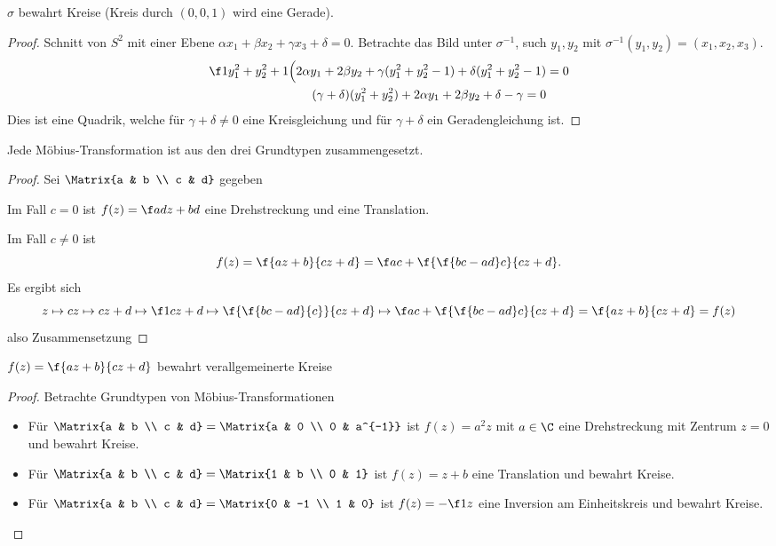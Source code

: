 \begin{lem}
	$\sigma$ bewahrt Kreise (Kreis durch $(0,0,1)$ wird eine Gerade).
	\begin{proof}
		Schnitt von $S^2$ mit einer Ebene $\alpha x_1 + \beta x_2 + \gamma x_3 + \delta = 0$.
		Betrachte das Bild unter $\sigma^{-1}$, such $y_1, y_2$ mit $\sigma^{-1}(y_1, y_2) = (x_1, x_2, x_3)$.
		\begin{align*}
			\f 1{y_1^2 + y_2^2 + 1} \Big( 2 \alpha y_1 + 2 \beta y_2 + \gamma (y_1^2 + y_2^2 - 1) + \delta (y_1^2 + y_2^2 - 1) &= 0 \\
			(\gamma + \delta)(y_1^2 + y_2^2) + 2 \alpha y_1 + 2 \beta y_2 + \delta - \gamma = 0
		\end{align*}
		Dies ist eine Quadrik, welche für $\gamma + \delta \neq 0$ eine Kreisgleichung und für $\gamma + \delta$ ein Geradengleichung ist.
	\end{proof}
\end{lem}

\begin{lem}
	Jede Möbius-Transformation ist aus den drei Grundtypen zusammengesetzt.
	\begin{proof}
		Sei $\Matrix{a & b \\ c & d}$ gegeben

		Im Fall $c = 0$ ist $f(z) = \f a d z + bd$ eine Drehstreckung und eine Translation.

		Im Fall $c \neq 0$ ist
		\[
			f(z) = \f {az + b}{cz + d}
			= \f ac + \f {\f {bc - ad}c}{cz + d}.
		\]
		Es ergibt sich
		\[
			z \mapsto c z \mapsto c z + d \mapsto \f 1{cz + d} \mapsto \f{\f{bc - ad}{c}}{cz + d} \mapsto \f ac + \f{\f{bc-ad}c}{cz+d} = \f {az + b}{cz + d} = f(z)
		\]
		also Zusammensetzung
	\end{proof}
\end{lem}

\begin{lem}
	$f(z) = \f {az + b} {cz + d}$ bewahrt verallgemeinerte Kreise
	\begin{proof}
		Betrachte Grundtypen von Möbius-Transformationen
		\begin{itemize}
			\item
				Für $\Matrix{a & b \\ c & d} = \Matrix{a & 0 \\ 0 & a^{-1}}$ ist $f(z) = a^2 z$ mit $a \in \C$ eine Drehstreckung mit Zentrum $z=0$ und bewahrt Kreise.
			\item
				Für $\Matrix{a & b \\ c & d} = \Matrix{1 & b \\ 0 & 1}$ ist $f(z) = z + b$ eine Translation und bewahrt Kreise.
			\item
				Für $\Matrix{a & b \\ c & d} = \Matrix{0 & -1 \\ 1 & 0}$ ist $f(z) = - \f 1z$ eine Inversion am Einheitskreis und bewahrt Kreise.
		\end{itemize}
	\end{proof}
\end{lem}

